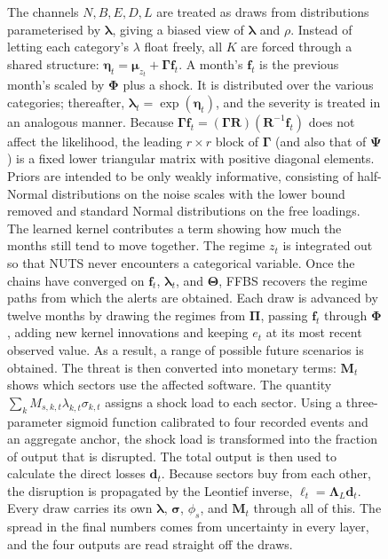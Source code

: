 \documentclass[review]{elsarticle}
\begin{document}
\begin{figure}[p]
{%
}
\caption{The channels $N, B, E, D, L$ are treated as draws from distributions parameterised by $\bm{\lambda}$, giving a biased view of $\bm{\lambda}$ and $\rho$. Instead of letting each category's $\lambda$ float freely, all $K$ are forced through a shared structure: $\bm{\eta}_t = \bm{\mu}_{z_t} + \bm{\Gamma}\bm{f}_t$. A month's $\bm{f}_t$ is the previous month's scaled by $\bm{\Phi}$ plus a shock. It is distributed over the various categories; thereafter, $\bm{\lambda}_t = \exp(\bm{\eta}_t)$, and the severity is treated in an analogous manner. Because $\bm{\Gamma}\bm{f}_t = (\bm{\Gamma}\bm{R})(\bm{R}^{-1}\bm{f}_t)$ does not affect the likelihood, the leading $r \times r$ block of $\bm{\Gamma}$ (and also that of $\bm{\Psi}$) is a fixed lower triangular matrix with positive diagonal elements. Priors are intended to be only weakly informative, consisting of half-Normal distributions on the noise scales with the lower bound removed and standard Normal distributions on the free loadings. The learned kernel contributes a term showing how much the months still tend to move together. The regime $z_t$ is integrated out so that NUTS never encounters a categorical variable. Once the chains have converged on $\bm{f}_t$, $\bm{\lambda}_t$, and $\bm{\Theta}$, FFBS recovers the regime paths from which the alerts are obtained. Each draw is advanced by twelve months by drawing the regimes from $\bm{\Pi}$, passing $\bm{f}_t$ through $\bm{\Phi}$, adding new kernel innovations and keeping $e_t$ at its most recent observed value. As a result,  a range of possible future scenarios is obtained. The threat is then converted into monetary terms: $\bm{M}_t$ shows which sectors use the affected software. The quantity $\sum_k M_{s,k,t}\lambda_{k,t}\sigma_{k,t}$ assigns a shock load to each sector. Using a three-parameter sigmoid function calibrated to four recorded events and an aggregate anchor, the shock load is transformed into the fraction of output that is disrupted. The total output is then used to calculate the direct losses $\bm{d}_t$. Because sectors buy from each other, the disruption is propagated by the Leontief inverse, $\bm{\ell}_t = \bm{\Lambda}_L \bm{d}_t$. Every draw carries its own $\bm{\lambda}$, $\bm{\sigma}$, $\phi_s$, and $\bm{M}_t$ through all of this. The spread in the final numbers comes from uncertainty in every layer, and the four outputs are read straight off the draws.}
\label{fig:pipeline}
\end{figure}
\endgroup
\end{document}
